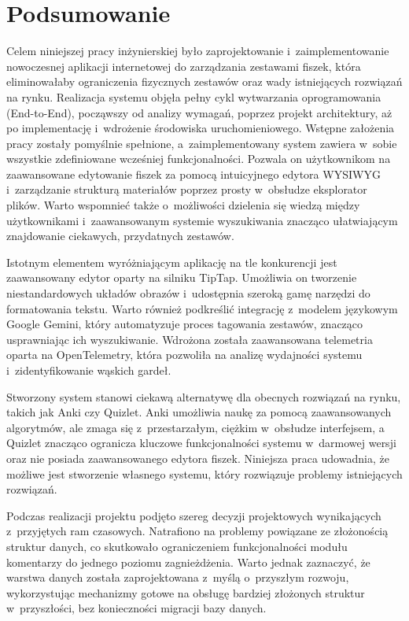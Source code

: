 \chapter{Podsumowanie}
\label{ch:podsumowanie}
Celem niniejszej pracy inżynierskiej było zaprojektowanie i~zaimplementowanie nowoczesnej aplikacji 
internetowej do zarządzania zestawami fiszek, która eliminowałaby ograniczenia fizycznych zestawów
oraz wady istniejących rozwiązań na rynku.
Realizacja systemu objęła pełny cykl wytwarzania oprogramowania (End-to-End), począwszy od analizy wymagań, 
poprzez projekt architektury, aż po implementację i~wdrożenie środowiska uruchomieniowego. Wstępne założenia pracy 
zostały pomyślnie spełnione, a~zaimplementowany system zawiera w~sobie wszystkie zdefiniowane wcześniej funkcjonalności.
Pozwala on użytkownikom na zaawansowane edytowanie fiszek za pomocą intuicyjnego edytora WYSIWYG i~zarządzanie 
strukturą materiałów poprzez prosty w~obsłudze eksplorator plików. Warto wspomnieć także o~możliwości dzielenia się wiedzą 
między użytkownikami i~zaawansowanym systemie wyszukiwania znacząco ułatwiającym znajdowanie ciekawych, przydatnych zestawów.

Istotnym elementem wyróżniającym aplikację na tle konkurencji jest zaawansowany edytor oparty na silniku TipTap. 
Umożliwia on tworzenie niestandardowych układów obrazów i~udostępnia szeroką gamę narzędzi do formatowania tekstu. 
Warto również podkreślić integrację z~modelem językowym Google Gemini, który automatyzuje proces tagowania zestawów, 
znacząco usprawniając ich wyszukiwanie. Wdrożona została zaawansowana telemetria oparta na OpenTelemetry, która pozwoliła 
na analizę wydajności systemu i~zidentyfikowanie wąskich gardeł.

Stworzony system stanowi ciekawą alternatywę dla obecnych rozwiązań na rynku, takich jak Anki czy Quizlet. 
Anki umożliwia naukę za pomocą zaawansowanych algorytmów, ale zmaga się z~przestarzałym, ciężkim w~obsłudze interfejsem, a~
Quizlet znacząco ogranicza kluczowe funkcjonalności systemu w~darmowej wersji oraz nie posiada zaawansowanego edytora fiszek. 
Niniejsza praca udowadnia, że możliwe jest stworzenie własnego systemu, który rozwiązuje problemy istniejących rozwiązań.

Podczas realizacji projektu podjęto szereg decyzji projektowych wynikających z~przyjętych ram czasowych. 
Natrafiono na problemy powiązane ze złożonością struktur danych, co skutkowało ograniczeniem funkcjonalności modułu komentarzy 
do jednego poziomu zagnieżdżenia. Warto jednak zaznaczyć, że warstwa danych została zaprojektowana z~myślą o~przyszłym rozwoju, 
wykorzystując mechanizmy gotowe na obsługę bardziej złożonych struktur w~przyszłości, bez konieczności migracji bazy danych.

